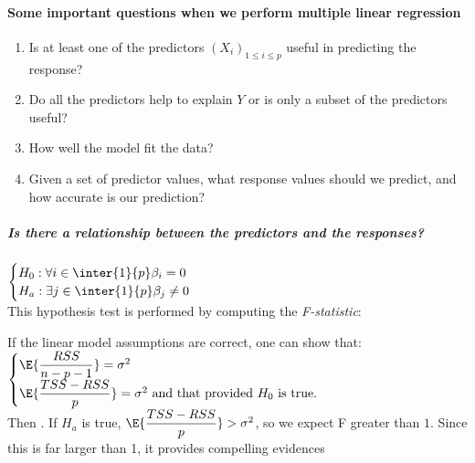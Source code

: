 \paragraph{Some important questions when we perform multiple linear
regression}
\begin{enumerate}
	\item Is at least one of the predictors $\left(X_{i}
		\right)_{1\leq i\leq p}$ useful in predicting the
		response?
	\item Do all the predictors help to explain $Y$ or is only a
		subset of the predictors useful?
	\item How well the model fit the data?
	\item Given a set of predictor values, what response values
		should we predict, and how accurate is our prediction?
\end{enumerate}
\subparagraph{Is there a relationship between the predictors and the
responses?}
$\begin{cases}
	H_{0}:\forall i\in\inter{1}{p} \beta_{i}=0\\
	H_{a}:\exists j\in\inter{1}{p} \beta_{j}\neq 0
\end{cases}$\\This hypothesis test is performed by computing the \emph{
F-statistic}:
\begin{center}
\end{center}
If the linear model assumptions are correct, one can show that:\\
$\begin{cases}
	\E{\dfrac{RSS}{n-p-1}}=\sigma^{2}\\
	\E{\dfrac{TSS-RSS}{p}}=\sigma^{2}\text{ and that provided }
	H_{0}\text{ is true.}
\end{cases}$\\Then {}. If $H_{a}$ is true, $\E{\dfrac{TSS-RSS}{
p}}>\sigma^{2}$, so we expect F greater than $1$.
Since this is far larger than 1, it provides compelling evidences
